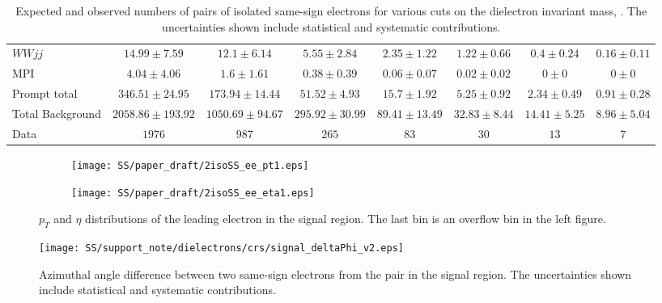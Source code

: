 \begin{table*}[htbp]
\begin{center}
{\begin{tabular}{l|c|c|c|c|c|c|c}
$WWjj$	& $ 14.99 \pm 7.59 $	& $ 12.1 \pm 6.14 $	& $ 5.55 \pm 2.84 $	& $ 2.35 \pm 1.22 $	& $ 1.22 \pm 0.66 $	& $ 0.4 \pm 0.24 $	& $ 0.16 \pm 0.11 $	\\[+0.05in]
MPI	& $ 4.04 \pm 4.06 $	& $ 1.6 \pm 1.61 $	& $ 0.38 \pm 0.39 $	& $ 0.06 \pm 0.07 $	& $ 0.02 \pm 0.02 $	& $ 0 \pm 0 $	& $ 0 \pm 0 $	\\[+0.05in]
\hline
Prompt total	& $ 346.51 \pm 24.95 $	& $ 173.94 \pm 14.44 $	& $ 51.52 \pm 4.93 $	& $ 15.7 \pm 1.92 $	& $ 5.25 \pm 0.92 $	& $ 2.34 \pm 0.49 $	& $ 0.91 \pm 0.28 $	\\[+0.05in]
\hline\hline
Total Background	& $ 2058.86 \pm 193.92 $	& $ 1050.69 \pm 94.67 $	& $ 295.92 \pm 30.99 $	& $ 89.41 \pm 13.49 $	& $ 32.83 \pm 8.44 $	& $ 14.41 \pm 5.25 $	& $ 8.96 \pm 5.04 $	\\[+0.05in]
\hline\hline
Data	& $ 1976 $	& $ 987 $	& $ 265 $	& $ 83 $	& $ 30 $	& $ 13 $	& $ 7 $	\\[+0.05in]

\hline
\end{tabular}
}
\end{center}
\caption{Expected and observed numbers of pairs of isolated same-sign electrons for various cuts on the dielectron invariant mass, \mee. The uncertainties shown include statistical and systematic contributions.}
\label{tab:2iso_ee_SS}
\end{table*}


\begin{figure}
\begin{subfigure}{.5\textwidth}
  \centering
  \texttt{[image: SS/paper\_draft/2isoSS\_ee\_pt1.eps]}
\end{subfigure}%
\begin{subfigure}{.5\textwidth}
  \centering
  \texttt{[image: SS/paper\_draft/2isoSS\_ee\_eta1.eps]}
\end{subfigure}
\caption{$p_T$ and $\eta$ distributions of the leading electron in the signal region. The last bin is an overflow bin in the left figure.}
  \label{fig:signal_kinematics}
\end{figure}

\begin{figure}[h]
\begin{center}
\texttt{[image: SS/support\_note/dielectrons/crs/signal\_deltaPhi\_v2.eps]}
\caption{Azimuthal angle difference between two same-sign electrons from the pair in the signal region. The uncertainties shown include statistical and systematic contributions.}
\label{fig:delta_phi}
\end{center}
\end{figure}



